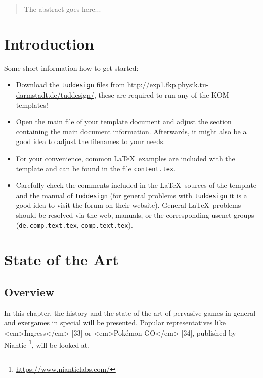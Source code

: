 \begin{abstract}
 The abstract goes here...
\end{abstract}



\chapter{Introduction}
Some short information how to get started:
\begin{itemize}
	\item Download the \texttt{tuddesign} files from \url{http://exp1.fkp.physik.tu-darmstadt.de/tuddesign/}, these are required to run any of the KOM templates!
	\item Open the main file of your template document and adjust the section containing the main document information. Afterwards, it might also be a good idea to adjust the filenames to your needs.
	\item For your convenience, common \LaTeX\ examples are included with the template and can be found in the file \texttt{content.tex}.
	\item Carefully check the comments included in the \LaTeX\ sources of the template and the manual of \texttt{tuddesign} (for general problems with \texttt{tuddesign} it is a good idea to visit the forum on their website). General \LaTeX\ problems should be resolved via the web, manuals, or the corresponding usenet groups (\texttt{de.comp.text.tex}, \texttt{comp.text.tex}).
\end{itemize}



\chapter{State of the Art}\label{ch:stateOfTheArt}
\section{Overview}
In this chapter, the history and the state of the art of pervasive games in general and exergames in special will be presented. Popular representatives like <em>Ingress</em> [33] or <em>Pokémon GO</em> [34], published by Niantic \footnote{\url{https://www.nianticlabs.com/}}, will be looked at.

